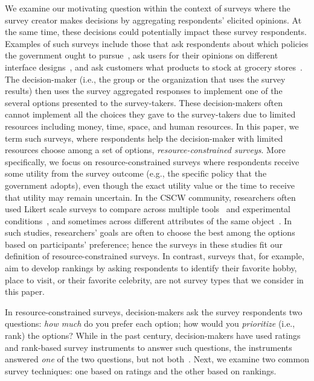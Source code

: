 {{We examine our motivating question within the context of surveys where the survey creator makes decisions by aggregating respondents' elicited opinions. At the same time, these decisions could potentially impact these survey respondents. Examples of such surveys include those that ask respondents about which policies the government ought to pursue~\cite{pew_spending}, ask users for their opinions on different interface designs~\cite{ledo2018evaluation}, and ask customers what products to stock at grocery stores~\cite{nielsen}. The decision-maker (i.e., the group or the organization that uses the survey results) then uses the survey aggregated responses to implement one of the several options presented to the survey-takers. These decision-makers often cannot implement all the choices they gave to the survey-takers due to limited resources including money, time, space, and human resources. In this paper, we term such surveys, where respondents help the decision-maker with limited resources choose among a set of options, \textit{resource-constrained surveys}. More specifically, we focus on resource-constrained surveys where respondents receive some utility from the survey outcome (e.g., the specific policy that the government adopts), even though the exact utility value or the time to receive that utility may remain uncertain. In the CSCW community, researchers often used Likert scale surveys to compare across multiple tools~\cite{zhang2017wikum} and experimental conditions~\cite{chang2017alpharead}, and sometimes across different attributes of the same object~\cite{cheng2017anyone, ma2017video}. In such studies, researchers' goals are often to choose the best among the options based on participants' preference; hence the surveys in these studies fit our definition of resource-constrained surveys. In contrast, surveys that, for example, aim to develop rankings by asking respondents to identify their favorite hobby, place to visit, or their favorite celebrity, are not survey types that we consider in this paper. 

In resource-constrained surveys, decision-makers ask the survey respondents two questions: \textit{how much} do you prefer each option; how would you \textit{prioritize} (i.e., rank) the options? While in the past century, decision-makers have used ratings and rank-based survey instruments to answer such questions, the instruments answered \emph{one} of the two questions, but not both~\cite{moors2016two}.  Next, we examine two common survey techniques: one based on ratings and the other based on rankings.

}}
